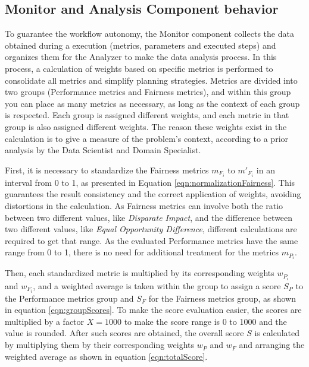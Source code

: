 \documentclass[sigconf]{acmart}
\begin{document}
\subsection{Monitor and Analysis Component behavior}

To guarantee the workflow autonomy, the Monitor component collects the data obtained during a execution (metrics, parameters and executed steps) and organizes them for the Analyzer to make the data analysis process. In this process, a calculation of weights based on specific metrics is performed to consolidate all metrics and simplify planning strategies. Metrics are divided into two groups (Performance metrics and Fairness metrics), and within this group you can place as many metrics as necessary, as long as the context of each group is respected. Each group is assigned different weights, and each metric in that group is also assigned different weights. The reason these weights exist in the calculation is to give a measure of the problem's context, according to a prior analysis by the Data Scientist and Domain Specialist.

First, it is necessary to standardize the Fairness metrics $m_{F_i}$ to $m'_{F_i}$ in an interval from 0 to 1, as presented in Equation \ref{eqn:normalizationFairness}. This guarantees the result consistency and the correct application of weights, avoiding distortions in the calculation. As Fairness metrics can involve both the ratio between two different values, like \textit{Disparate Impact}, and the difference between two different values, like \textit{Equal Opportunity Difference}, different calculations are required to get that range. As the evaluated Performance metrics have the same range from 0 to 1, there is no need for additional treatment for the metrics $m_{P_i}$.

Then, each standardized metric is multiplied by its corresponding weights $w_{P_i}$ and $w_{F_i}$, and a weighted average is taken within the group to assign a score $S_P$ to the Performance metrics group and $S_F$ for the Fairness metrics group, as shown in equation \ref{eqn:groupScores}. To make the score evaluation easier, the scores are multiplied by a factor $X = 1000$ to make the score range is 0 to 1000 and the value is rounded. After such scores are obtained, the overall score $S$ is calculated by multiplying them by their corresponding weights $w_P$ and $w_F$ and arranging the weighted average as shown in equation \ref{eqn:totalScore}.
\end{document}
